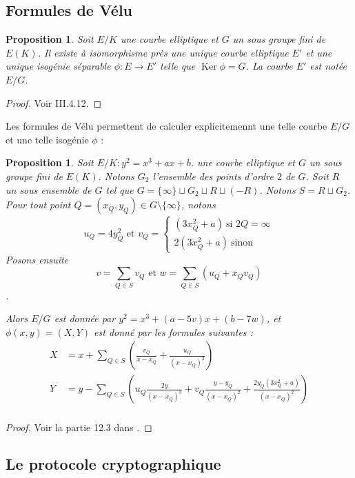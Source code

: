 \documentclass{article}
\theoremstyle{plain}%
\newtheorem{prop}[thm]{Proposition}
\theoremstyle{definition}%
\DeclareMathOperator{\Ker}{Ker}
\begin{document}
\subsection{Formules de Vélu}

\begin{prop}
  Soit $E/K$ une courbe elliptique et $G$ un sous groupe fini de $E(K)$. Il existe à isomorphisme près une unique courbe elliptique $E'$ et une unique isogénie séparable $\phi : E \to E'$ telle que $\Ker \phi = G$. La courbe $E'$ est notée $E/G$.
\end{prop}

\begin{proof}
  Voir \cite{Silverman} III.4.12.
\end{proof}

Les formules de Vélu permettent de calculer explicitemennt une telle courbe $E/G$ et une telle isogénie $\phi$ : 
\begin{prop}
  Soit $E/K : y^2 = x^3 +ax +b$. une courbe elliptique et $G$ un sous groupe fini de $E(K)$. Notons $G_2$ l'ensemble des points d'ordre $2$ de $G$. Soit $R$ un sous ensemble de $G$ tel que $G = \{\infty\}  \sqcup G_2 \sqcup R \sqcup (-R)$. Notons $S = R \sqcup G_2$.
  Pour tout point $Q=(x_Q, y_Q)\in G\setminus \{\infty\}$, notons 
  $$u_Q = 4y_Q^2  \text{\ \ et\ \ }     
  v_Q = 
    \begin{cases}
      (3x_Q^2 + a)\ \text{si $2Q = \infty$}\\ 
      2(3x_Q^2 + a)\ \text{sinon}
    \end{cases}$$
    Posons ensuite $$v = \sum_{Q\in S}v_Q   \text{\ \ et\ \ } w  = \sum_{Q\in S}(u_Q + x_Qv_Q)$$.

    Alors $E/G$ est donnée par $y^2 = x^3 + (a-5v)x + (b-7w)$, et $\phi (x, y) = (X, Y)$ est donné par les formules suivantes :
\begin{align*}
  X &= x + \sum_{Q\in S}\left( \frac{v_Q}{x-x_Q} + \frac{u_Q}{(x-x_Q)^2} \right)\\
  Y &= y - \sum_{Q\in S}\left( u_Q\frac{2y}{(x-x_Q)^3} + v_Q\frac{y-y_Q}{(x-x_Q)^2} + \frac{2y_Q(3x_Q^2 +a)}{(x-x_Q)^2} \right)\\
\end{align*}
 \end{prop}

\begin{proof}
  Voir la partie 12.3 dans \cite{Washington}. 
\end{proof}


\subsection{Le protocole cryptographique}
\end{document}
